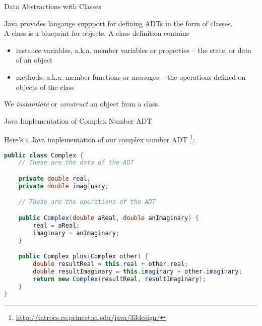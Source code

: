 \documentclass{beamer}
\begin{document}
\begin{frame}{Data Abstractions with Classes}

Java provides langauge suppport for defining ADTs in the form of classes.\\

A class is a blueprint for objects.  A class definition contains
\begin{itemize}
\item instance variables, a.k.a. member variables or properties -- the state, or data of an object
\item methods, a.k.a. member functions or messages -- the operations defined on objects of the class
\end{itemize}
We {\em instantiate} or {\em construct} an object from a class.
\end{frame}


\begin{frame}[fragile]{Java Implementation of Complex Number ADT}


Here's a Java implementation of our complex number ADT \footnote{\url{http://introcs.cs.princeton.edu/java/33design/}}:
\vspace{-.1in}
\begin{lstlisting}[language=Java]
public class Complex {
    // These are the data of the ADT

    private double real;
    private double imaginary;

    // These are the operations of the ADT

    public Complex(double aReal, double anImaginary) {
        real = aReal;
        imaginary = anImaginary;
    }

    public Complex plus(Complex other) {
        double resultReal = this.real + other.real;
        double resultImaginary = this.imaginary + other.imaginary;
        return new Complex(resultReal, resultImaginary);
    }
}
\end{lstlisting}


\end{frame}
\end{document}
